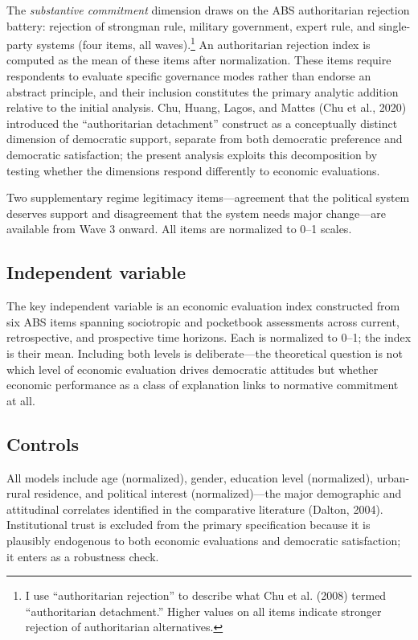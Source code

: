 \documentclass[
  12pt,
  12pt,
  letterpaper]{article}
\begin{document}
The \emph{substantive commitment} dimension draws on the ABS
authoritarian rejection battery: rejection of strongman rule, military
government, expert rule, and single-party systems (four items, all
waves).\footnote{I use ``authoritarian rejection'' to describe what Chu
  et al. (2008) termed ``authoritarian detachment.'' Higher values on
  all items indicate stronger rejection of authoritarian alternatives.}
An authoritarian rejection index is computed as the mean of these items
after normalization. These items require respondents to evaluate
specific governance modes rather than endorse an abstract principle, and
their inclusion constitutes the primary analytic addition relative to
the initial analysis. Chu, Huang, Lagos, and Mattes (Chu et al., 2020)
introduced the ``authoritarian detachment'' construct as a conceptually
distinct dimension of democratic support, separate from both democratic
preference and democratic satisfaction; the present analysis exploits
this decomposition by testing whether the dimensions respond differently
to economic evaluations.

Two supplementary regime legitimacy items---agreement that the political
system deserves support and disagreement that the system needs major
change---are available from Wave 3 onward. All items are normalized to
0--1 scales.

\subsection{Independent variable}\label{independent-variable}

The key independent variable is an economic evaluation index constructed
from six ABS items spanning sociotropic and pocketbook assessments
across current, retrospective, and prospective time horizons. Each is
normalized to 0--1; the index is their mean. Including both levels is
deliberate---the theoretical question is not which level of economic
evaluation drives democratic attitudes but whether economic performance
as a class of explanation links to normative commitment at all.

\subsection{Controls}\label{controls}

All models include age (normalized), gender, education level
(normalized), urban-rural residence, and political interest
(normalized)---the major demographic and attitudinal correlates
identified in the comparative literature (Dalton, 2004). Institutional
trust is excluded from the primary specification because it is plausibly
endogenous to both economic evaluations and democratic satisfaction; it
enters as a robustness check.
\end{document}
